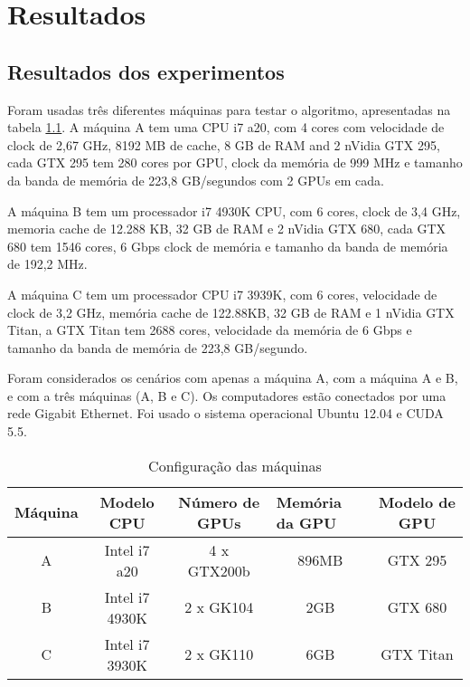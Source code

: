 \pagestyle{empty}
\cleardoublepage
\pagestyle{fancy}

\onehalfspacing

\chapter{Resultados}\label{cap6}

\section{Resultados dos experimentos}\label{cap6:intro}

Foram usadas três diferentes máquinas para testar o algoritmo, apresentadas na tabela \ref{table: machines}. A máquina A tem uma CPU i7 a20, com 4 cores com velocidade de clock de 2,67 GHz, 8192 MB de cache, 8 GB de RAM and 2 nVidia GTX 295, cada GTX 295 tem 280 cores por GPU, clock da memória de 999 MHz e tamanho da banda de memória de 223,8 GB/segundos com 2 GPUs em cada. 

A máquina B  tem um processador i7 4930K CPU, com 6 cores, clock de 3,4 GHz, memoria cache de 12.288 KB, 32 GB de RAM e 2 nVidia GTX 680, cada GTX 680 tem 1546 cores, 6 Gbps clock de memória e tamanho da banda de memória de 192,2 MHz. 

A máquina C tem um processador CPU i7 3939K, com 6 cores, velocidade de clock de 3,2 GHz, memória cache de 122.88KB, 32 GB de RAM e 1 nVidia GTX Titan, a GTX Titan tem 2688 cores, velocidade da memória de 6 Gbps e tamanho da banda de memória de 223,8 GB/segundo. 

Foram considerados os cenários com apenas a máquina A, com a máquina A e B, e com a três máquinas (A, B e C). Os computadores estão conectados por uma rede Gigabit Ethernet. Foi usado o sistema operacional Ubuntu 12.04 e CUDA 5.5.


\begin{table}[!t]
\centering
\tiny
\caption{Configuração das máquinas}

\begin{tabular}{|c|c|c|c|c|}
\hline
\multicolumn{1}{|l|}{Máquina} & Modelo CPU  & Número de GPUs & \multicolumn{1}{l|}{Memória da GPU } & Modelo de GPU \\ \hline
A                             & Intel i7 a20   & 4 x GTX200b         & 896MB                          & GTX 295   \\ \hline
B                             & Intel i7 4930K  & 2 x GK104           & 2GB                            & GTX 680   \\ \hline
C                             & Intel i7 3930K & 2 x GK110     & 6GB                            & GTX Titan \\ \hline
\end{tabular}
\label{table: machines}
\end{table}


